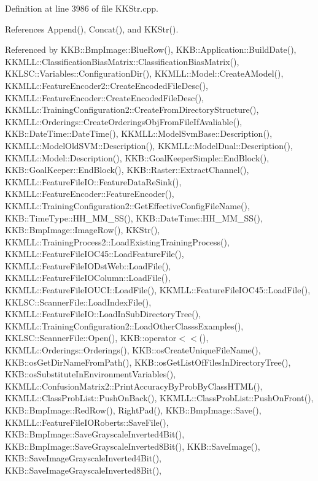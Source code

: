 Definition at line 3986 of file K\+K\+Str.\+cpp.



References Append(), Concat(), and K\+K\+Str().



Referenced by K\+K\+B\+::\+Bmp\+Image\+::\+Blue\+Row(), K\+K\+B\+::\+Application\+::\+Build\+Date(), K\+K\+M\+L\+L\+::\+Classification\+Bias\+Matrix\+::\+Classification\+Bias\+Matrix(), K\+K\+L\+S\+C\+::\+Variables\+::\+Configuration\+Dir(), K\+K\+M\+L\+L\+::\+Model\+::\+Create\+A\+Model(), K\+K\+M\+L\+L\+::\+Feature\+Encoder2\+::\+Create\+Encoded\+File\+Desc(), K\+K\+M\+L\+L\+::\+Feature\+Encoder\+::\+Create\+Encoded\+File\+Desc(), K\+K\+M\+L\+L\+::\+Training\+Configuration2\+::\+Create\+From\+Directory\+Structure(), K\+K\+M\+L\+L\+::\+Orderings\+::\+Create\+Orderings\+Obj\+From\+File\+If\+Avaliable(), K\+K\+B\+::\+Date\+Time\+::\+Date\+Time(), K\+K\+M\+L\+L\+::\+Model\+Svm\+Base\+::\+Description(), K\+K\+M\+L\+L\+::\+Model\+Old\+S\+V\+M\+::\+Description(), K\+K\+M\+L\+L\+::\+Model\+Dual\+::\+Description(), K\+K\+M\+L\+L\+::\+Model\+::\+Description(), K\+K\+B\+::\+Goal\+Keeper\+Simple\+::\+End\+Block(), K\+K\+B\+::\+Goal\+Keeper\+::\+End\+Block(), K\+K\+B\+::\+Raster\+::\+Extract\+Channel(), K\+K\+M\+L\+L\+::\+Feature\+File\+I\+O\+::\+Feature\+Data\+Re\+Sink(), K\+K\+M\+L\+L\+::\+Feature\+Encoder\+::\+Feature\+Encoder(), K\+K\+M\+L\+L\+::\+Training\+Configuration2\+::\+Get\+Effective\+Config\+File\+Name(), K\+K\+B\+::\+Time\+Type\+::\+H\+H\+\_\+\+M\+M\+\_\+\+S\+S(), K\+K\+B\+::\+Date\+Time\+::\+H\+H\+\_\+\+M\+M\+\_\+\+S\+S(), K\+K\+B\+::\+Bmp\+Image\+::\+Image\+Row(), K\+K\+Str(), K\+K\+M\+L\+L\+::\+Training\+Process2\+::\+Load\+Existing\+Training\+Process(), K\+K\+M\+L\+L\+::\+Feature\+File\+I\+O\+C45\+::\+Load\+Feature\+File(), K\+K\+M\+L\+L\+::\+Feature\+File\+I\+O\+Dst\+Web\+::\+Load\+File(), K\+K\+M\+L\+L\+::\+Feature\+File\+I\+O\+Column\+::\+Load\+File(), K\+K\+M\+L\+L\+::\+Feature\+File\+I\+O\+U\+C\+I\+::\+Load\+File(), K\+K\+M\+L\+L\+::\+Feature\+File\+I\+O\+C45\+::\+Load\+File(), K\+K\+L\+S\+C\+::\+Scanner\+File\+::\+Load\+Index\+File(), K\+K\+M\+L\+L\+::\+Feature\+File\+I\+O\+::\+Load\+In\+Sub\+Directory\+Tree(), K\+K\+M\+L\+L\+::\+Training\+Configuration2\+::\+Load\+Other\+Classs\+Examples(), K\+K\+L\+S\+C\+::\+Scanner\+File\+::\+Open(), K\+K\+B\+::operator$<$$<$(), K\+K\+M\+L\+L\+::\+Orderings\+::\+Orderings(), K\+K\+B\+::os\+Create\+Unique\+File\+Name(), K\+K\+B\+::os\+Get\+Dir\+Name\+From\+Path(), K\+K\+B\+::os\+Get\+List\+Of\+Files\+In\+Directory\+Tree(), K\+K\+B\+::os\+Substitute\+In\+Environment\+Variables(), K\+K\+M\+L\+L\+::\+Confusion\+Matrix2\+::\+Print\+Accuracy\+By\+Prob\+By\+Class\+H\+T\+M\+L(), K\+K\+M\+L\+L\+::\+Class\+Prob\+List\+::\+Push\+On\+Back(), K\+K\+M\+L\+L\+::\+Class\+Prob\+List\+::\+Push\+On\+Front(), K\+K\+B\+::\+Bmp\+Image\+::\+Red\+Row(), Right\+Pad(), K\+K\+B\+::\+Bmp\+Image\+::\+Save(), K\+K\+M\+L\+L\+::\+Feature\+File\+I\+O\+Roberts\+::\+Save\+File(), K\+K\+B\+::\+Bmp\+Image\+::\+Save\+Grayscale\+Inverted4\+Bit(), K\+K\+B\+::\+Bmp\+Image\+::\+Save\+Grayscale\+Inverted8\+Bit(), K\+K\+B\+::\+Save\+Image(), K\+K\+B\+::\+Save\+Image\+Grayscale\+Inverted4\+Bit(), K\+K\+B\+::\+Save\+Image\+Grayscale\+Inverted8\+Bit(), 